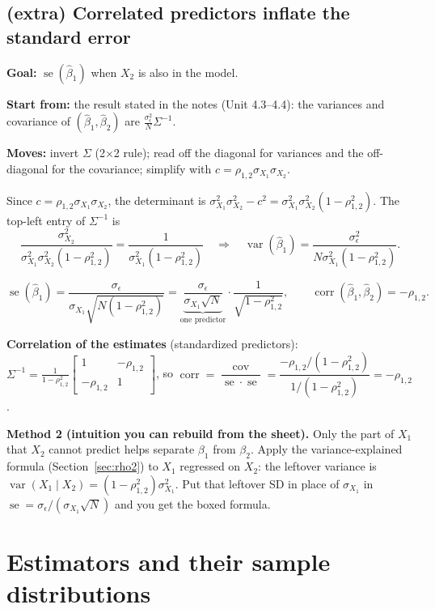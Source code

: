 \documentclass[11pt]{article}
\newcommand{\Var}{\operatorname{var}}
\newcommand{\Cov}{\operatorname{cov}}
\newcommand{\corr}{\operatorname{corr}}
\newcommand{\se}{\operatorname{se}}
\newcommand{\given}{\mid}
\newcommand{\goal}[1]{\textbf{Goal:} #1\par}
\newcommand{\start}[1]{\textbf{Start from:} #1\par}
\newcommand{\moves}[1]{\textbf{Moves:} #1\par}
\begin{document}
\subsection{(extra) Correlated predictors inflate the standard error}\label{sec:inflate}
\begin{methodbox}
\goal{$\se(\hat\beta_1)$ when $X_2$ is also in the model.}
\start{the result stated in the notes (Unit 4.3--4.4): the variances and covariance of $(\hat\beta_1,\hat\beta_2)$ are $\frac{\sigma_\epsilon^2}{N}\Sigma^{-1}$.}
\moves{invert $\Sigma$ (2$\times$2 rule); read off the diagonal for variances and the off-diagonal for the covariance; simplify with
$c=\rho_{1,2}\sigma_{X_1}\sigma_{X_2}$.}
\end{methodbox}
Since $c=\rho_{1,2}\sigma_{X_1}\sigma_{X_2}$, the determinant is $\sigma_{X_1}^2\sigma_{X_2}^2-c^2=\sigma_{X_1}^2\sigma_{X_2}^2(1-\rho_{1,2}^2)$. The top-left entry of $\Sigma^{-1}$ is
\[
\frac{\sigma_{X_2}^2}{\sigma_{X_1}^2\sigma_{X_2}^2(1-\rho_{1,2}^2)}=\frac{1}{\sigma_{X_1}^2(1-\rho_{1,2}^2)}
\quad\Longrightarrow\quad
\Var(\hat\beta_1)=\frac{\sigma_\epsilon^2}{N\sigma_{X_1}^2(1-\rho_{1,2}^2)} .
\]
\begin{keybox}
\[
\se(\hat\beta_1)=\frac{\sigma_\epsilon}{\sigma_{X_1}\sqrt{N(1-\rho_{1,2}^2)}}=\underbrace{\frac{\sigma_\epsilon}{\sigma_{X_1}\sqrt N}}_{\text{one predictor}}\cdot\frac{1}{\sqrt{1-\rho_{1,2}^2}},
\qquad \corr(\hat\beta_1,\hat\beta_2)=-\rho_{1,2}.
\]
\end{keybox}
\textbf{Correlation of the estimates} (standardized predictors): $\Sigma^{-1}=\frac{1}{1-\rho_{1,2}^2}\begin{bmatrix}1&-\rho_{1,2}\\-\rho_{1,2}&1\end{bmatrix}$,
so $\corr=\dfrac{\Cov}{\se\cdot\se}=\dfrac{-\rho_{1,2}/(1-\rho_{1,2}^2)}{1/(1-\rho_{1,2}^2)}=-\rho_{1,2}$.

\textbf{Method 2 (intuition you can rebuild from the sheet).} Only the part of $X_1$ that $X_2$ cannot predict helps separate $\beta_1$ from
$\beta_2$. Apply the variance-explained formula (Section~\ref{sec:rho2}) to $X_1$ regressed on $X_2$: the leftover variance is
$\Var(X_1\given X_2)=(1-\rho_{1,2}^2)\sigma_{X_1}^2$. Put that leftover SD in place of $\sigma_{X_1}$ in $\se=\sigma_\epsilon/(\sigma_{X_1}\sqrt N)$ and you get
the boxed formula.

\clearpage
\section{Estimators and their sample distributions}\label{sec:est}
\end{document}
